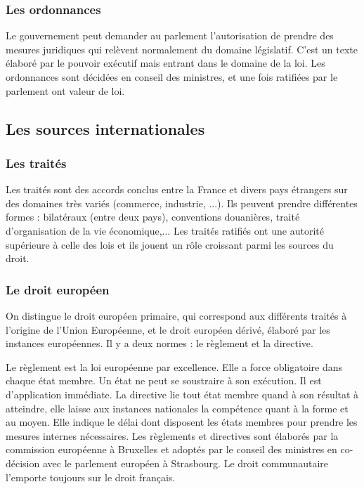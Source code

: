 \documentclass[11pt]{article}
\begin{document}
			\subsubsection{Les ordonnances}
				Le gouvernement peut demander au parlement l'autorisation de prendre des mesures juridiques qui relèvent normalement du domaine législatif. C'est un texte élaboré par le pouvoir exécutif mais entrant dans le domaine de la loi. Les ordonnances sont décidées en conseil des ministres, et une fois ratifiées par le parlement ont valeur de loi.
				
		\subsection{Les sources internationales}
			\subsubsection{Les traités}
				Les traités sont des accords conclus entre la France et divers pays étrangers sur des domaines très variés (commerce, industrie, ...). Ils peuvent prendre différentes formes : bilatéraux (entre deux pays), conventions douanières, traité d'organisation de la vie économique,... Les traités ratifiés ont une autorité supérieure à celle des lois et ils jouent un rôle croissant parmi les sources du droit.
				
			\subsubsection{Le droit européen}
				On distingue le droit européen primaire, qui correspond aux différents traités à l'origine de l'Union Européenne, et le droit européen dérivé, élaboré par les instances européennes. Il y a deux normes : le règlement et la directive.
				
				Le règlement est la loi européenne par excellence. Elle a force obligatoire dans chaque état membre. Un état ne peut se soustraire à son exécution. Il est d'application immédiate. 	La directive lie tout état membre quand à son résultat à atteindre, elle laisse aux instances nationales la compétence quant à la forme et au moyen. Elle indique le délai dont disposent les états membres pour prendre les mesures internes nécessaires. Les règlements et directives sont élaborés par la commission européenne à Bruxelles et adoptés par le conseil des ministres en co-décision avec le parlement européen à Strasbourg. Le droit communautaire l'emporte toujours sur le droit français.
				
\end{document}
